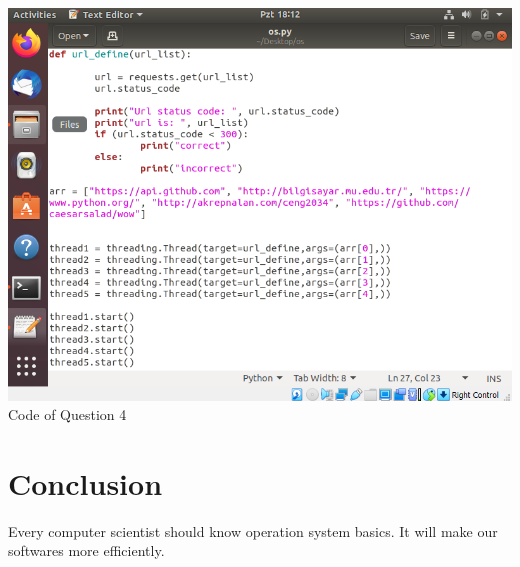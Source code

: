 \documentclass[onecolumn]{article}
\begin{document}
\includegraphics[width=\textwidth]{cozum4.PNG}
Code of Question 4



\section{Conclusion}
Every computer scientist should know operation system basics. It will make our softwares more efficiently.


\nocite{*}


\end{document}
